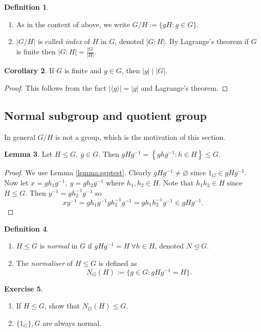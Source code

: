 \documentclass[a4paper]{article}
\theoremstyle{definition}
\newtheorem{defn}{Definition}[subsection]
\newtheorem{lemma}[defn]{Lemma}
\newtheorem{coro}[defn]{Corollary}
\newtheorem{exe}[defn]{Exercise}
\begin{document}
\begin{defn}
\begin{enumerate}
\item As in the context of above, we write $G/H:=\{gH:g\in G\}$.
\item $|G/H|$ is called \textit{index} of $H$ in $G$, denoted $|G:H|$. By Lagrange's theorem if $G$ is finite then $|G:H|=\frac{|G|}{|H|}$.
\end{enumerate}
\end{defn}
\begin{coro}
If $G$ is finite and $g\in G$, then $|g|\mid |G|$.
\end{coro}
\begin{proof}
This follows from the fact $|\langle g\rangle |=|g|$ and Lagrange's theorem.
\end{proof}

\subsection{Normal subgroup and quotient group}
In general $G/H$ is not a group, which is the motivation of this section.
\begin{lemma}
Let $H\leq G,\ g\in G$. Then $gHg^{-1}=\left\{ghg^{-1}:h\in H\right\} \leq G$.
\end{lemma}
\begin{proof}
We use Lemma \ref{lemma:sgptest}. Clearly $gHg^{-1}\neq \varnothing$ since $1_G\in gHg^{-1}$. Now let $x=gh_1g^{-1},\ y=gh_2g^{-1}$ where $h_1,h_2\in H$. Note that $h_1h_2\in H$ since $H\leq G$. Then $y^{-1}=gh_2^{-1}g^{-1}$ so
\[
xy^{-1}=gh_1g^{-1}gh_2^{-1}g^{-1}=gh_1h_2^{-1}g^{-1} \in gHg^{-1}.
\]
\end{proof}
\begin{defn}
\begin{enumerate}
\item $H\leq G$ is \textit{normal} in $G$ if $gHg^{-1}=H \ \forall h\in H$, denoted $N\unlhd G$.
\item The \textit{normaliser} of $H\leq G$ is defined as
\[
N_G(H):=\{g\in G:gHg^{-1}=H\}.
\]
\end{enumerate}
\end{defn}
\begin{exe}
\begin{enumerate}
\item If $H\leq G$, show that $N_G(H)\leq G$.
\item $\{1_G\},G$ are always normal.
\end{enumerate}
\end{exe}
\end{document}
